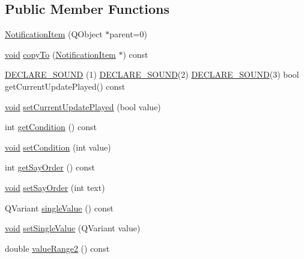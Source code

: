 \subsection*{\-Public \-Member \-Functions}
\begin{DoxyCompactItemize}
\item 
\hyperlink{group___notify_plugin_ga382be87567eab960b4bd89e2c7238ba8}{\-Notification\-Item} (\-Q\-Object $\ast$parent=0)
\item 
\hyperlink{group___u_a_v_objects_plugin_ga444cf2ff3f0ecbe028adce838d373f5c}{void} \hyperlink{group___notify_plugin_ga308d07be5a887bb4e35319a55c70fb06}{copy\-To} (\hyperlink{class_notification_item}{\-Notification\-Item} $\ast$) const 
\item 
\hyperlink{group___notify_plugin_gafd8fcfb284be8c92e29aba742748d4b8}{\-D\-E\-C\-L\-A\-R\-E\-\_\-\-S\-O\-U\-N\-D} (1) \hyperlink{group___notify_plugin_gafd8fcfb284be8c92e29aba742748d4b8}{\-D\-E\-C\-L\-A\-R\-E\-\_\-\-S\-O\-U\-N\-D}(2) \hyperlink{group___notify_plugin_gafd8fcfb284be8c92e29aba742748d4b8}{\-D\-E\-C\-L\-A\-R\-E\-\_\-\-S\-O\-U\-N\-D}(3) bool get\-Current\-Update\-Played() const 
\item 
\hyperlink{group___u_a_v_objects_plugin_ga444cf2ff3f0ecbe028adce838d373f5c}{void} \hyperlink{group___notify_plugin_ga3df23419f46ace03f4874972e2a14579}{set\-Current\-Update\-Played} (bool value)
\item 
int \hyperlink{group___notify_plugin_ga04c987109a0ab4c1f9d719a6c0e3096a}{get\-Condition} () const 
\item 
\hyperlink{group___u_a_v_objects_plugin_ga444cf2ff3f0ecbe028adce838d373f5c}{void} \hyperlink{group___notify_plugin_gab14a508f3cd7fd060939a7c8320b35e2}{set\-Condition} (int value)
\item 
int \hyperlink{group___notify_plugin_ga395bd37d71abbcb58be1b077e0dd83f6}{get\-Say\-Order} () const 
\item 
\hyperlink{group___u_a_v_objects_plugin_ga444cf2ff3f0ecbe028adce838d373f5c}{void} \hyperlink{group___notify_plugin_ga0489a9c8b690360558e02eb562a34974}{set\-Say\-Order} (int text)
\item 
\-Q\-Variant \hyperlink{group___notify_plugin_ga2c73d25e5b3deadb7b7aec06957e91c5}{single\-Value} () const 
\item 
\hyperlink{group___u_a_v_objects_plugin_ga444cf2ff3f0ecbe028adce838d373f5c}{void} \hyperlink{group___notify_plugin_gacadb2d38a2a7d648f40454fd26f50ad8}{set\-Single\-Value} (\-Q\-Variant value)
\item 
double \hyperlink{group___notify_plugin_ga55c7c963b3a43675f58dfe2af221b0c2}{value\-Range2} () const 

\end{DoxyCompactItemize}
